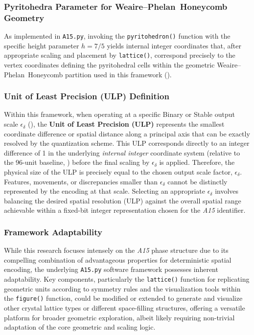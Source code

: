 \documentclass[10pt]{article}
\def\AAAB{\textit{A15}}
\def\WP{Weaire--Phelan}
\def\WPH{\WP{}~Honeycomb}
\begin{document}
\subsubsection{Pyritohedra Parameter for \WPH{} Geometry}\label{subsubsec-notes-h75}
As implemented in \texttt{A15.py}, invoking the \texttt{pyritohedron()} function with the specific height parameter $h=7/5$ yields internal integer coordinates that, after appropriate scaling and placement by \texttt{lattice()}, correspond precisely to the vertex coordinates defining the pyritohedral cells within the geometric \WPH{} partition used in this framework ().

\subsubsection{Unit of Least Precision (ULP) Definition}\label{subsubsec-notes-ulp}
Within this framework, when operating at a specific Binary or Stable output scale $\epsilon_\delta$ (), the \textbf{Unit of Least Precision (ULP)} represents the smallest coordinate difference or spatial distance along a principal axis that can be exactly resolved by the quantization scheme. This ULP corresponds directly to an integer difference of \num{1} in the underlying \emph{internal integer} coordinate system (relative to the 96-unit baseline, ) before the final scaling by $\epsilon_\delta$ is applied. Therefore, the physical size of the ULP is precisely equal to the chosen output scale factor, $\epsilon_\delta$. Features, movements, or discrepancies smaller than $\epsilon_\delta$ cannot be distinctly represented by the encoding at that scale. Selecting an appropriate $\epsilon_\delta$ involves balancing the desired spatial resolution (ULP) against the overall spatial range achievable within a fixed-bit integer representation chosen for the \AAAB{} identifier.

\subsubsection{Framework Adaptability}\label{subsubsec-notes-adaptability}
While this research focuses intensely on the \AAAB{} phase structure due to its compelling combination of advantageous properties for deterministic spatial encoding, the underlying \texttt{A15.py} software framework possesses inherent adaptability. Key components, particularly the \texttt{lattice()} function for replicating geometric units according to symmetry rules and the visualization tools within the \texttt{figure()} function, could be modified or extended to generate and visualize other crystal lattice types or different space-filling structures, offering a versatile platform for broader geometric exploration, albeit likely requiring non-trivial adaptation of the core geometric and scaling logic.
\end{document}
